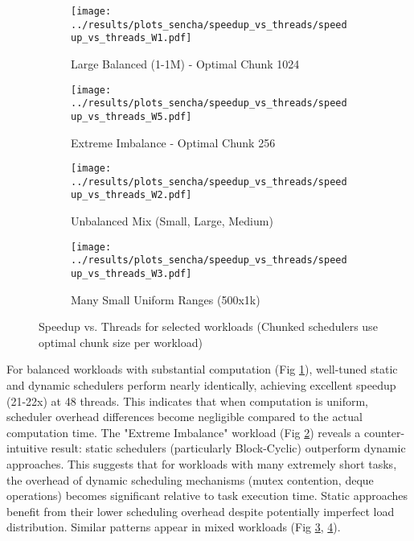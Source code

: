 \documentclass[10pt]{article}
\begin{document}
\begin{figure}[H]
    \centering
    \begin{subfigure}[b]{0.49\textwidth}
        \centering
        \texttt{[image: ../results/plots\_sencha/speedup\_vs\_threads/speedup\_vs\_threads\_W1.pdf]}
        \caption{Large Balanced (1-1M) - Optimal Chunk 1024}
        \label{fig:speedup_large_balanced}
    \end{subfigure}
    \hfill
    \begin{subfigure}[b]{0.49\textwidth}
        \centering
        \texttt{[image: ../results/plots\_sencha/speedup\_vs\_threads/speedup\_vs\_threads\_W5.pdf]}
        \caption{Extreme Imbalance - Optimal Chunk 256}
        \label{fig:speedup_extreme_imbalance}
    \end{subfigure}

    \vspace{1em}

    \begin{subfigure}[b]{0.49\textwidth}
        \centering
        \texttt{[image: ../results/plots\_sencha/speedup\_vs\_threads/speedup\_vs\_threads\_W2.pdf]}
        \caption{Unbalanced Mix (Small, Large, Medium)}
        \label{fig:speedup_unbalanced_mix}
    \end{subfigure}
    \hfill
    \begin{subfigure}[b]{0.49\textwidth}
        \centering
        \texttt{[image: ../results/plots\_sencha/speedup\_vs\_threads/speedup\_vs\_threads\_W3.pdf]}
        \caption{Many Small Uniform Ranges (500x1k)}
        \label{fig:speedup_many_small}
    \end{subfigure}

    \caption{Speedup vs. Threads for selected workloads (Chunked schedulers use optimal chunk size per workload)}
    \label{fig:speedup_comparison_grid}
\end{figure}

For balanced workloads with substantial computation (Fig \ref{fig:speedup_large_balanced}), well-tuned static and dynamic schedulers perform nearly identically, achieving excellent speedup (21-22x) at 48 threads. This indicates that when computation is uniform, scheduler overhead differences become negligible compared to the actual computation time. The "Extreme Imbalance" workload (Fig \ref{fig:speedup_extreme_imbalance}) reveals a counter-intuitive result: static schedulers (particularly Block-Cyclic) outperform dynamic approaches. This suggests that for workloads with many extremely short tasks, the overhead of dynamic scheduling mechanisms (mutex contention, deque operations) becomes significant relative to task execution time. Static approaches benefit from their lower scheduling overhead despite potentially imperfect load distribution. Similar patterns appear in mixed workloads (Fig \ref{fig:speedup_unbalanced_mix}, \ref{fig:speedup_many_small}).
\end{document}
